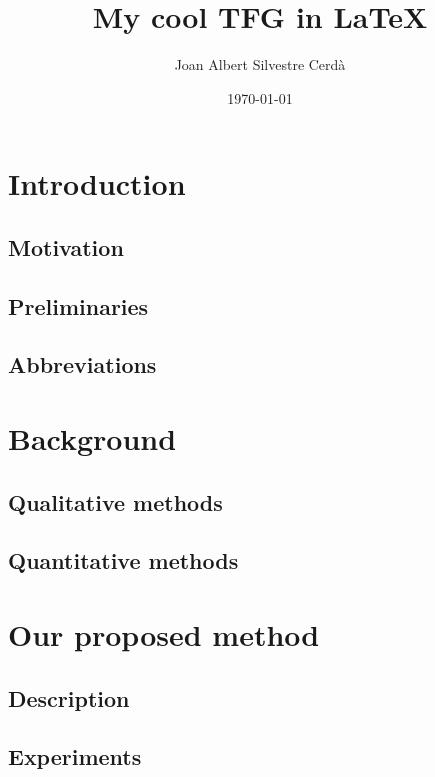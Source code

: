 \documentclass[12pt]{book}
\title{\bf My cool TFG in \LaTeX}
\author{Joan Albert Silvestre Cerd\`{a}}
\date{\today}
\begin{document}
\frontmatter          
\maketitle            
\tableofcontents      
\mainmatter           
\chapter{Introduction}  
 
\section{Motivation}

\section{Preliminaries}

\section{Abbreviations}

\chapter{Background}

\section{Qualitative methods}

\section{Quantitative methods}

\chapter{Our proposed method}

\section{Description}

\section{Experiments}
\end{document}
